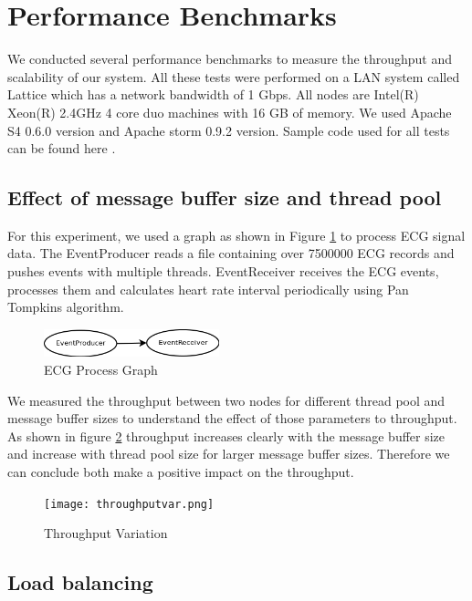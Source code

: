 \section{Performance Benchmarks}

We conducted several performance benchmarks to measure the throughput and scalability of our system. All these tests were performed on a LAN system called Lattice which has a network bandwidth of 1 Gbps. All nodes are Intel(R) Xeon(R) 2.4GHz 4 core duo machines with 16 GB of memory. We used Apache S4 0.6.0 version and Apache storm 0.9.2 version. Sample code used for all tests can be found here \cite{solutionCode}.


\subsection{Effect of message buffer size and thread pool}
For this experiment, we used a graph as shown in Figure \ref{ecgGraph} to process ECG signal data. The EventProducer reads a file containing over 7500000
 ECG records and pushes events with multiple threads. EventReceiver receives the ECG events, processes them and calculates heart rate interval periodically using Pan Tompkins algorithm. 

\begin{figure}[!t]
        \centering
        \includegraphics[width=2.0in]{ecgGraph.png}
        \caption{ECG Process Graph}
        \label{ecgGraph}
\end{figure}


We measured the throughput between two nodes for different thread pool and message buffer sizes to understand the effect of those parameters to throughput. As shown in figure \ref{throughputvar} throughput increases clearly with the message buffer size and increase with thread pool size for larger message buffer sizes. Therefore we can conclude both make a positive impact on the throughput.

\begin{figure}[!t]
        \centering
        \texttt{[image: throughputvar.png]}
        \caption{Throughput Variation}
        \label{throughputvar}
\end{figure}

\subsection{Load balancing}

